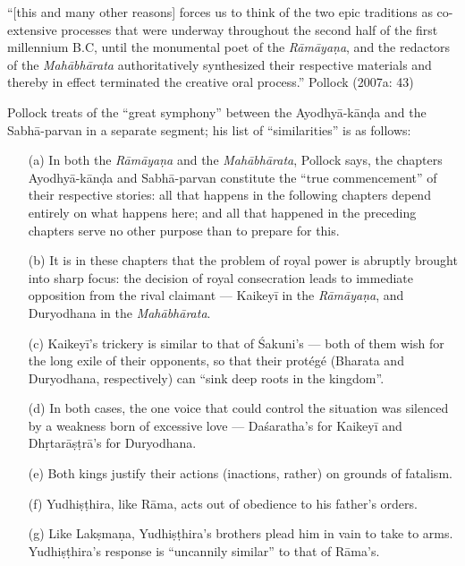 \begin{myquote}
“[this and many other reasons] forces us to think of the two epic traditions as co-extensive processes that were underway throughout the second half of the first millennium B.C, until the monumental poet of the {\sl Rāmāyaṇa}, and the redactors of the {\sl Mahābhārata} authoritatively synthesized their respective materials and thereby in effect terminated the creative oral process.”
\hfill Pollock (2007a: 43)
\end{myquote}

Pollock treats of the “great symphony” between the Ayodhyā-kānḍa and the Sabhā-parvan in a separate segment; his list of “similarities” is as follows: 
\begin{itemize}
\item[(a)] In both the {\sl Rāmāyaṇa} and the {\sl Mahābhārata}, Pollock says, the chapters Ayodhyā-kānḍa and Sabhā-parvan constitute the “true commencement” of their respective stories: all that happens in the following chapters depend entirely on what happens here; and all that happened in the preceding chapters serve no other purpose than to prepare for this.

\item[(b)] It is in these chapters that the problem of royal power is abruptly brought into sharp focus: the decision of royal consecration leads to immediate opposition from the rival claimant --- Kaikeyī in the {\sl Rāmāyaṇa}, and Duryodhana in the {\sl Mahābhārata}. 

\item[(c)] Kaikeyī’s trickery is similar to that of Śakuni’s --- both of them wish for the long exile of their opponents, so that their protégé (Bharata and Duryodhana, respectively) can “sink deep roots in the kingdom”. 

\item[(d)] In both cases, the one voice that could control the situation was silenced by a weakness born of excessive love --- Daśaratha’s for Kaikeyī and Dhṛtarāṣṭrā’s for Duryodhana.  

\item[(e)] Both kings justify their actions (inactions, rather) on grounds of fatalism.

\item[(f)] Yudhiṣṭhira, like Rāma, acts out of obedience to his father’s orders. 

\item[(g)] Like Lakṣmaṇa, Yudhiṣṭhira’s brothers plead him in vain to take to arms. Yudhiṣṭhira’s response is “uncannily similar” to that of Rāma’s.  
\end{itemize}

